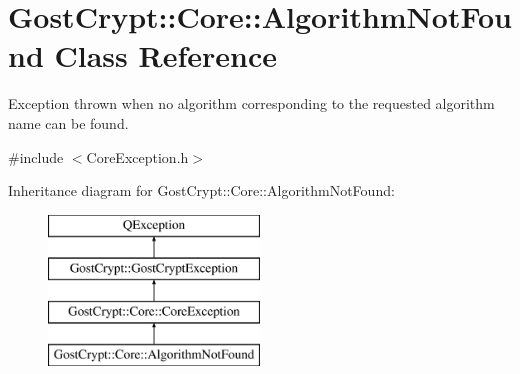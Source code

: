 \hypertarget{class_gost_crypt_1_1_core_1_1_algorithm_not_found}{}\section{Gost\+Crypt\+:\+:Core\+:\+:Algorithm\+Not\+Found Class Reference}
\label{class_gost_crypt_1_1_core_1_1_algorithm_not_found}


Exception thrown when no algorithm corresponding to the requested algorithm name can be found.  




{\ttfamily \#include $<$Core\+Exception.\+h$>$}

Inheritance diagram for Gost\+Crypt\+:\+:Core\+:\+:Algorithm\+Not\+Found\+:\begin{figure}[H]
\begin{center}
\leavevmode
\includegraphics[height=4.000000cm]{class_gost_crypt_1_1_core_1_1_algorithm_not_found}
\end{center}
\end{figure}
